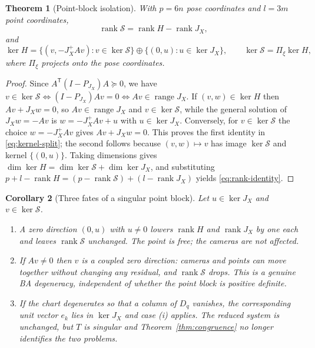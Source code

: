 \documentclass[11pt,a4paper]{article}
\newtheorem{theorem}{Theorem}
\newtheorem{corollary}[theorem]{Corollary}
\theoremstyle{definition}
\theoremstyle{remark}
\DeclareMathOperator{\rank}{rank}
\newcommand{\T}{\mathsf{T}}
\begin{document}
\begin{theorem}[Point-block isolation]\label{thm:schur}
With $p=6n$ pose coordinates and $l=3m$ point coordinates,
\begin{equation}
\rank\mathcal S=\rank H-\rank J_X,
\label{eq:rank-identity}
\end{equation}
and
\begin{equation}
\ker H=\{(v,-J_X^{+}Av):v\in\ker\mathcal S\}\oplus\{(0,u):u\in\ker J_X\},
\qquad
\ker\mathcal S=\Pi_\xi\ker H,
\label{eq:kernel-split}
\end{equation}
where $\Pi_\xi$ projects onto the pose coordinates.
\end{theorem}
\begin{proof}
Since $A^{\T}(I-P_{J_X})A\succeq0$, we have $v\in\ker\mathcal S\iff(I-P_{J_X})Av=0\iff Av\in\operatorname{range}J_X$. If $(v,w)\in\ker H$ then $Av+J_Xw=0$, so $Av\in\operatorname{range}J_X$ and $v\in\ker\mathcal S$, while the general solution of $J_Xw=-Av$ is $w=-J_X^{+}Av+u$ with $u\in\ker J_X$. Conversely, for $v\in\ker\mathcal S$ the choice $w=-J_X^{+}Av$ gives $Av+J_Xw=0$. This proves the first identity in \eqref{eq:kernel-split}; the second follows because $(v,w)\mapsto v$ has image $\ker\mathcal S$ and kernel $\{(0,u)\}$. Taking dimensions gives $\dim\ker H=\dim\ker\mathcal S+\dim\ker J_X$, and substituting $p+l-\rank H=(p-\rank\mathcal S)+(l-\rank J_X)$ yields \eqref{eq:rank-identity}.
\end{proof}

\begin{corollary}[Three fates of a singular point block]\label{cor:fates}
Let $u\in\ker J_X$ and $v\in\ker\mathcal S$.
\begin{enumerate}[label=(\roman*),leftmargin=2.4em]
  \item A zero direction $(0,u)$ with $u\neq0$ lowers $\rank H$ and $\rank J_X$ by one each and leaves $\rank\mathcal S$ unchanged. The point is free; the cameras are not affected.
  \item If $Av\neq0$ then $v$ is a coupled zero direction: cameras and points can move together without changing any residual, and $\rank\mathcal S$ drops. This is a genuine BA degeneracy, independent of whether the point block is positive definite.
  \item If the chart degenerates so that a column of $D_q$ vanishes, the corresponding unit vector $e_k$ lies in $\ker J_X$ and case (i) applies. The reduced system is unchanged, but $T$ is singular and Theorem~\ref{thm:congruence} no longer identifies the two problems.
\end{enumerate}
\end{corollary}
\end{document}

